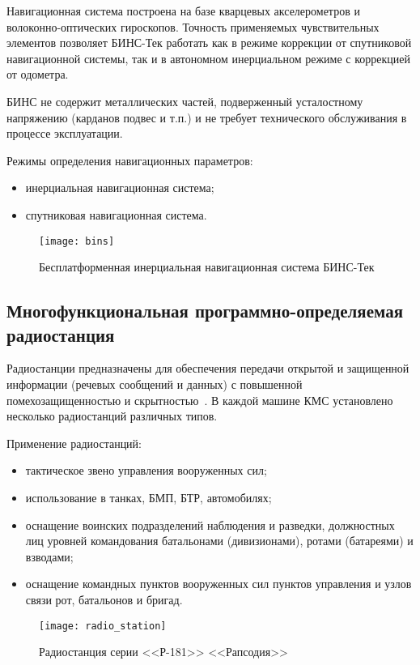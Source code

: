 Навигационная система построена на базе кварцевых акселерометров и волоконно-оптических гироскопов. Точность применяемых чувствительных элементов позволяет БИНС-Тек работать как в режиме коррекции от спутниковой навигационной системы, так и в автономном инерциальном режиме с коррекцией от одометра.

БИНС не содержит металлических частей, подверженный усталостному напряжению (карданов подвес и т.п.) и не требует технического обслуживания в процессе эксплуатации.

Режимы определения навигационных параметров:
\begin{itemize}
	\item инерциальная навигационная система;
	\item спутниковая навигационная система.
\end{itemize}
\begin{figure}[ht]
	\centering
	\texttt{[image: bins]}
	\caption{Бесплатформенная инерциальная навигационная система БИНС-Тек~\cite{bins}}
	\label{fig:lit_reiview:ins:bins}
\end{figure}

\subsection{Многофункциональная программно-определяемая радиостанция}
\label{sub:lit_review:radio}

Радиостанции предназначены для обеспечения передачи открытой и защищенной информации (речевых сообщений и данных) с
повышенной помехозащищенностью и скрытностью~\cite{prc9661}.
В каждой машине КМС установлено несколько радиостанций различных типов.

Применение радиостанций:
\begin{itemize}
	\item тактическое звено управления вооруженных сил;
	\item использование в танках, БМП, БТР, автомобилях;
	\item оснащение воинских подразделений наблюдения и разведки, должностных лиц уровней командования батальонами
		(дивизионами), ротами (батареями) и взводами;
	\item оснащение командных пунктов вооруженных сил пунктов управления и узлов связи рот, батальонов и бригад.
\end{itemize}

\begin{figure}[htb]
	\centering
	\texttt{[image: radio\_station]}
	\caption{Радиостанция серии <<Р-181>> <<Рапсодия>>~\cite{prc9661}}
	\label{fig:lit_reiview:meteo:radio_station}
\end{figure}

